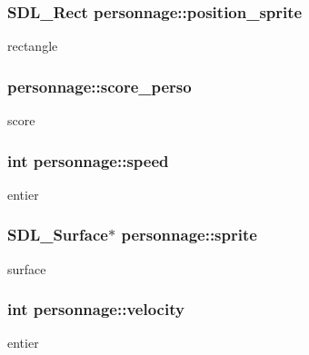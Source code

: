 \subsubsection[{\texorpdfstring{position\+\_\+sprite}{position_sprite}}]{\setlength{\rightskip}{0pt plus 5cm}S\+D\+L\+\_\+\+Rect personnage\+::position\+\_\+sprite}\hypertarget{structpersonnage_a6f6ed0df27eb1c8f5238c4f8fea3cde9}{}\label{structpersonnage_a6f6ed0df27eb1c8f5238c4f8fea3cde9}
rectangle 
\subsubsection[{\texorpdfstring{score\+\_\+perso}{score_perso}}]{ personnage\+::score\+\_\+perso}\hypertarget{structpersonnage_a7ea99b7d0c8445cb3d7ba6717eb89d8c}{}\label{structpersonnage_a7ea99b7d0c8445cb3d7ba6717eb89d8c}
score 
\subsubsection[{\texorpdfstring{speed}{speed}}]{\setlength{\rightskip}{0pt plus 5cm}int personnage\+::speed}\hypertarget{structpersonnage_acb8e0ece93e2c7c15a1672e2867edc19}{}\label{structpersonnage_acb8e0ece93e2c7c15a1672e2867edc19}
entier 
\subsubsection[{\texorpdfstring{sprite}{sprite}}]{\setlength{\rightskip}{0pt plus 5cm}S\+D\+L\+\_\+\+Surface$\ast$ personnage\+::sprite}\hypertarget{structpersonnage_a8adbc94f4634e562d2499a96c9513102}{}\label{structpersonnage_a8adbc94f4634e562d2499a96c9513102}
surface 
\subsubsection[{\texorpdfstring{velocity}{velocity}}]{\setlength{\rightskip}{0pt plus 5cm}int personnage\+::velocity}\hypertarget{structpersonnage_aa10eda88d070839448f1c429dbbffdae}{}\label{structpersonnage_aa10eda88d070839448f1c429dbbffdae}
entier 

